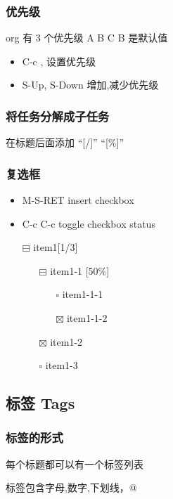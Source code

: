 \documentclass[11pt]{article}
\begin{document}
\subsubsection{优先级}
\label{sec:orgc2356f8}
org 有 3 个优先级 A B C
B 是默认值

\begin{itemize}
\item C-c ,
设置优先级
\item S-Up, S-Down
增加,减少优先级
\end{itemize}

\subsubsection{将任务分解成子任务}
\label{sec:orga18335b}
在标题后面添加 ``[/]'' ``[\%]''

\subsubsection{复选框}
\label{sec:org4e6ac79}
\begin{itemize}
\item M-S-RET
insert checkbox
\item C-c C-c
toggle checkbox status

\item[{$\boxminus$}] item1[1/3]
\begin{itemize}
\item[{$\boxminus$}] item1-1 [50\%]
\begin{itemize}
\item[{$\square$}] item1-1-1
\item[{$\boxtimes$}] item1-1-2
\end{itemize}
\item[{$\boxtimes$}] item1-2
\item[{$\square$}] item1-3
\end{itemize}
\end{itemize}

\subsection{标签 Tags}
\label{sec:org1a064eb}
\subsubsection{标签的形式}
\label{sec:orga81c738}
每个标题都可以有一个标签列表

标签包含字母,数字,下划线，@
\end{document}
